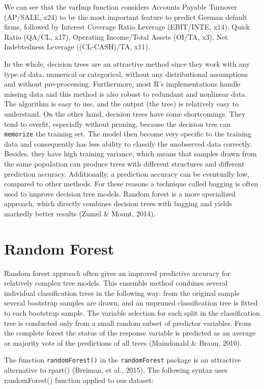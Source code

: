 \documentclass{article}
\begin{document}
We can see that the varImp function considers Accounts Payable Turnover (AP/SALE, x24) to be the most important feature to predict German default firms, followed by Interest Coverage Ratio Leverage (EBIT/INTE, x14), Quick Ratio (QA/CL, x17), Operating Income/Total Assets (OI/TA, x3), Net Indebtedness Leverage ((CL-CASH)/TA, x11).

In the whole, decision trees are an attractive method since they work with any type of data, numerical or categorical, without any distributional assumptions and without pre-processing. Furthermore, most R's implementations handle missing data and this method is also robust to redundant and nonlinear data. The algorithm is easy to use, and the output (the tree) is relatively easy to understand. On the other hand, decision trees have some shortcomings. They tend to overfit, especially without pruning, because the decision tree can \texttt{memorize} the training set. The model then become very specific to the training data and consequently has less ability to classify the unobserved data correctly. Besides, they have high training variance, which means that samples drawn from the same population can produce trees with different structures and different prediction accuracy. Additionally, a prediction accuracy can be eventually low, compared to other methods. For these reasons a technique called bagging is often used to improve decision tree models. Random forest is a more specialized approach, which directly combines decision trees with bagging and yields markedly better results (Zumel \& Mount, 2014). 

\section{Random Forest}

Random forest approach often gives an improved predictive accuracy for relatively complex tree models. This ensemble method combines several individual classification trees in the following way: from the original sample several bootstrap samples are drawn, and an unpruned classification tree is fitted to each bootstrap sample. The variable selection for each split in the classification tree is conducted only from a small random subset of predictor variables. From the complete forest the status of the response variable is predicted as an average or majority vote of the predictions of all trees (Maindonald \& Braun, 2010).

The function \texttt{randomForest()} in the \texttt{randomForest} package is an attractive alternative to rpart() (Breiman, et al., 2015). The following syntax uses randomForest() function applied to our dataset:
\end{document}
